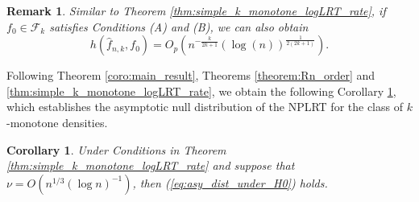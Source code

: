 \documentclass[12pt,letterpaper, twoside, openany]{article}
\theoremstyle{plain}
\newtheorem{corollary}[theorem]{Corollary}
\newtheorem{remark}[theorem]{Remark}
\begin{document}
\begin{remark}
    Similar to Theorem \ref{thm:simple_k_monotone_logLRT_rate}, if $f_0 \in \mathcal{F}_k$ satisfies Conditions (A) and (B), we can also obtain
    \begin{equation*}
        h(\hat{f}_{n,k}, f_0) = O_p\left(n^{-\frac{k}{2k+1}} (\log(n))^{\frac{1}{2(2k+1)}}\right).	
    \end{equation*}
    
\end{remark}


Following Theorem \ref{coro:main_result}, Theorems \ref{theorem:Rn_order} and  \ref{thm:simple_k_monotone_logLRT_rate}, we obtain the following Corollary \ref{cor:simple_k_monotone_null}, which establishes the asymptotic null distribution of the NPLRT for the class of $k$-monotone densities.
	
\begin{corollary}\label{cor:simple_k_monotone_null}
    Under Conditions in Theorem \ref{thm:simple_k_monotone_logLRT_rate} and %
    suppose that $\nu = O(n^{1/3}(\log n)^{-1})$, then (\ref{eq:asy_dist_under_H0}) holds.
\end{corollary}
\end{document}
